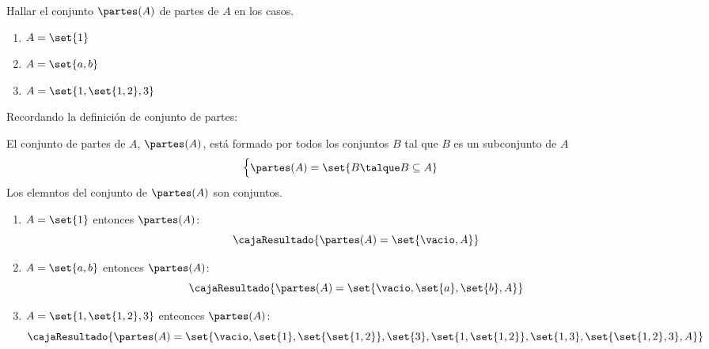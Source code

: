 \begin{enunciado}{\ejercicio}
  Hallar el conjunto $\partes(A)$ de partes de $A$ en los casos.
  \begin{multicols}{3}
    \begin{enumerate}[label=\roman*)]
      \item $A = \set{1}$
      \item $A = \set{a,b}$
      \item $A = \set{1,\set{1,2},3}$
    \end{enumerate}
  \end{multicols}
\end{enunciado}

Recordando la definición de conjunto de partes:

El conjunto de partes de $A$, $\partes(A)$, está formado por todos los conjuntos $B$ tal que $B$ es un subconjunto de $A$
$$
  \begin{cases}
    \partes(A) = \set{B \talque B \subseteq A}
  \end{cases}
$$
Los elemntos del conjunto de $\partes(A)$ son conjuntos.

\begin{enumerate}[label=(\roman*)]
  \item $A = \set{1}$ entonces $\partes(A)$:
        $$
          \cajaResultado{
            \partes(A) = \set{\vacio, A}
          }
        $$

  \item $A =
          \set{a, b}
        $ entonces $\partes(A)$:
        $$
          \cajaResultado{
            \partes(A) =
            \set{
              \vacio,
              \set{a},
              \set{b},
              A
            }
          }
        $$

  \item $
          A =
          \set{1, \set{1,2}, 3}
        $ enteonces $\partes(A)$:
        $$
          \cajaResultado{
            \partes(A) =
            \set{
              \vacio,
              \set{1},
              \set{\set{1,2}},
              \set{3},
              \set{1,\set{1,2}},
              \set{1,3},
              \set{\set{1,2},3},
              A
            }
          }
        $$
\end{enumerate}

\begin{aportes}
  \item {}
\end{aportes}
